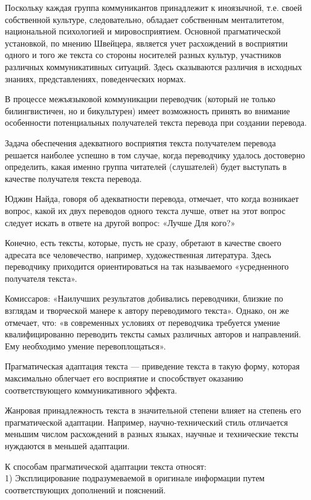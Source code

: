 Поскольку каждая группа коммуникантов принадлежит к иноязычной, т.е. своей собственной культуре, следовательно, обладает собственным менталитетом, национальной психологией и мировосприятием. Основной прагматической установкой, по мнению Швейцера, является учет расхождений в восприятии одного и того же текста со стороны носителей разных культур, участников различных коммуникативных ситуаций. Здесь сказываются различия в исходных знаниях, представлениях, поведенческих нормах.

В процессе межъязыковой коммуникации переводчик (который не только билингвистичен, но и бикультурен) имеет возможность принять во внимание особенности потенциальных получателей текста перевода при создании перевода.

Задача обеспечения адекватного восприятия текста получателем перевода решается наиболее успешно в том случае, когда переводчику удалось достоверно определить, какая именно группа читателей (слушателей) будет выступать в качестве получателя текста перевода. 

Юджин Найда, говоря об адекватности перевода, отмечает, что когда возникает вопрос, какой их двух переводов одного текста лучше, ответ на этот вопрос следует искать в ответе на другой вопрос: «Лучше Для кого?»

Конечно, есть тексты, которые, пусть не сразу, обретают в качестве своего адресата все человечество, например, художественная литература. Здесь переводчику приходится ориентироваться на так называемого «усредненного получателя текста».

Комиссаров: «Наилучших результатов добивались переводчики, близкие по взглядам и творческой манере к автору переводимого текста». Однако, он же отмечает, что: «в современных условиях от переводчика требуется умение квалифицированно переводить тексты самых различных авторов и направлений. Ему необходимо умение перевоплощаться».

Прагматическая адаптация текста --- приведение текста в такую форму, которая максимально облегчает его восприятие и способствует оказанию соответствующего коммуникативного эффекта.

Жанровая принадлежность текста в значительной степени влияет на степень его прагматической адаптации. Например, научно-технический стиль отличается меньшим числом расхождений в разных языках, научные и технические тексты нуждаются в меньшей адаптации.

К способам прагматической адаптации текста относят:
\\
1) Эксплицирование подразумеваемой в оригинале информации путем соответствующих дополнений и пояснений.

